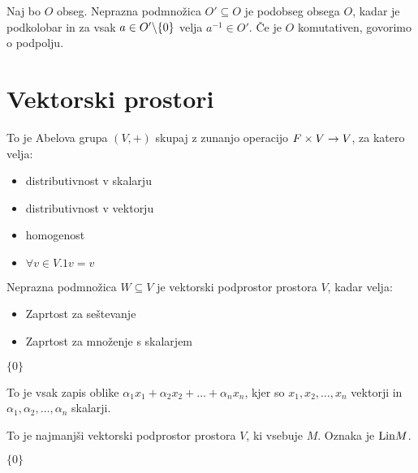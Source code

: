 
Naj bo $O$ obseg. Neprazna podmnožica $O' \subseteq O$ je podobseg obsega $O$, kadar je podkolobar in za vsak $a \in O' \backslash \{0\}$ velja $a^{-1} \in O'$. Če je $O$ komutativen, govorimo o podpolju.

\section{Vektorski prostori}


To je Abelova grupa $(V,+)$ skupaj z zunanjo operacijo $F\times V \to V$, za katero velja:
\begin{itemize}
	\item distributivnost v skalarju
	\item distributivnost v vektorju
	\item homogenost
	\item $\forall v \in V. 1v = v$
\end{itemize}


Neprazna podmnožica $W \subseteq V$ je vektorski podprostor prostora $V$, kadar velja:
\begin{itemize}
	\item Zaprtost za seštevanje
	\item Zaprtost za množenje s skalarjem
\end{itemize}


$\{0\}$


To je vsak zapis oblike $\alpha_1 x_1 + \alpha_2 x_2 + \ldots + \alpha_n x_n$, kjer so $x_1, x_2, \ldots, x_n$ vektorji in $\alpha_1, \alpha_2, \ldots, \alpha_n$ skalarji.


To je najmanjši vektorski podprostor prostora $V$, ki vsebuje $M$. Oznaka je $\text{Lin} M$.


$\{0\}$



